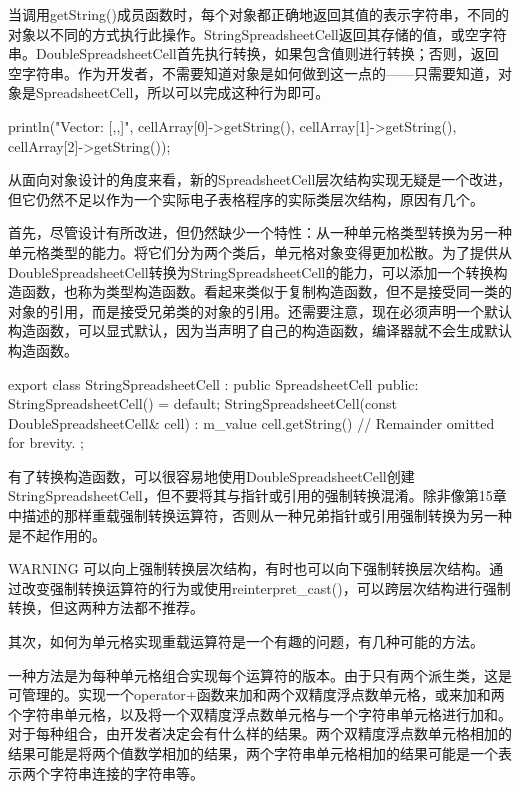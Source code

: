 当调用getString()成员函数时，每个对象都正确地返回其值的表示字符串，不同的对象以不同的方式执行此操作。StringSpreadsheetCell返回其存储的值，或空字符串。DoubleSpreadsheetCell首先执行转换，如果包含值则进行转换；否则，返回空字符串。作为开发者，不需要知道对象是如何做到这一点的——只需要知道，对象是SpreadsheetCell，所以可以完成这种行为即可。

\begin{cpp}
println("Vector: [{},{},{}]", cellArray[0]->getString(),
                              cellArray[1]->getString(),
                              cellArray[2]->getString());
\end{cpp}



从面向对象设计的角度来看，新的SpreadsheetCell层次结构实现无疑是一个改进，但它仍然不足以作为一个实际电子表格程序的实际类层次结构，原因有几个。

首先，尽管设计有所改进，但仍然缺少一个特性：从一种单元格类型转换为另一种单元格类型的能力。将它们分为两个类后，单元格对象变得更加松散。为了提供从DoubleSpreadsheetCell转换为StringSpreadsheetCell的能力，可以添加一个转换构造函数，也称为类型构造函数。看起来类似于复制构造函数，但不是接受同一类的对象的引用，而是接受兄弟类的对象的引用。还需要注意，现在必须声明一个默认构造函数，可以显式默认，因为当声明了自己的构造函数，编译器就不会生成默认构造函数。

\begin{cpp}
export class StringSpreadsheetCell : public SpreadsheetCell
{
    public:
        StringSpreadsheetCell() = default;
        StringSpreadsheetCell(const DoubleSpreadsheetCell& cell)
            : m_value { cell.getString() }
        { }
        // Remainder omitted for brevity.
};
\end{cpp}

有了转换构造函数，可以很容易地使用DoubleSpreadsheetCell创建StringSpreadsheetCell，但不要将其与指针或引用的强制转换混淆。除非像第15章中描述的那样重载强制转换运算符，否则从一种兄弟指针或引用强制转换为另一种是不起作用的。

\begin{myWarning}{WARNING}
可以向上强制转换层次结构，有时也可以向下强制转换层次结构。通过改变强制转换运算符的行为或使用reinterpret\_cast()，可以跨层次结构进行强制转换，但这两种方法都不推荐。
\end{myWarning}

其次，如何为单元格实现重载运算符是一个有趣的问题，有几种可能的方法。

一种方法是为每种单元格组合实现每个运算符的版本。由于只有两个派生类，这是可管理的。实现一个operator+函数来加和两个双精度浮点数单元格，或来加和两个字符串单元格，以及将一个双精度浮点数单元格与一个字符串单元格进行加和。对于每种组合，由开发者决定会有什么样的结果。两个双精度浮点数单元格相加的结果可能是将两个值数学相加的结果，两个字符串单元格相加的结果可能是一个表示两个字符串连接的字符串等。

